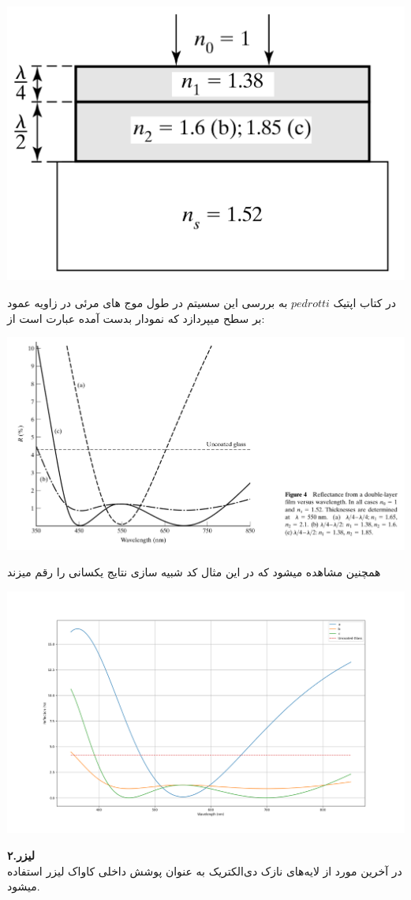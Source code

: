 \documentclass{article}
\begin{document}
	\begin{center}
		\includegraphics[height=.3\linewidth]{image_2025-07-16_20-45-14}
	\end{center}
	در کتاب اپتیک $pedrotti$ به بررسی این سسیتم در طول موج های مرئی در زاویه عمود بر سطح میپردازد که نمودار بدست آمده عبارت است از:
	\begin{center}
		\includegraphics[height=.5\linewidth]{image_2025-07-16_20-39-13}
	\end{center}
	\newpage
	همچنین مشاهده میشود که در این مثال کد شبیه سازی نتایج یکسانی را رقم میزند
	\begin{center}
		\includegraphics[height=.5\linewidth]{fig1}
	\end{center}
	
	\textbf{۲.لیزر}
	\\
	
	 در آخرین مورد از لایه‌های نازک دی‌الکتریک به عنوان پوشش داخلی کاواک لیزر استفاده میشود.
	
\end{document}
